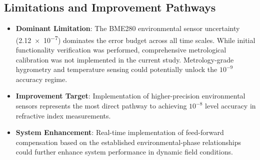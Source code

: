 \documentclass[aip,reprint,groupedaddress,onecolumn,superscriptaddress]{revtex4-2}
\begin{document}
\subsection{Limitations and Improvement Pathways}
\begin{itemize}
    \item \textbf{Dominant Limitation}: The BME280 environmental sensor uncertainty (\num{2.12e-7}) dominates the error budget across all time scales. While initial functionality verification was performed, comprehensive metrological calibration was not implemented in the current study. Metrology-grade hygrometry and temperature sensing could potentially unlock the $10^{-9}$ accuracy regime.

    \item \textbf{Improvement Target}: Implementation of higher-precision environmental sensors represents the most direct pathway to achieving $10^{-8}$ level accuracy in refractive index measurements.
    
    \item \textbf{System Enhancement}: Real-time implementation of feed-forward compensation based on the established environmental-phase relationships could further enhance system performance in dynamic field conditions.
\end{itemize}



\end{document}
